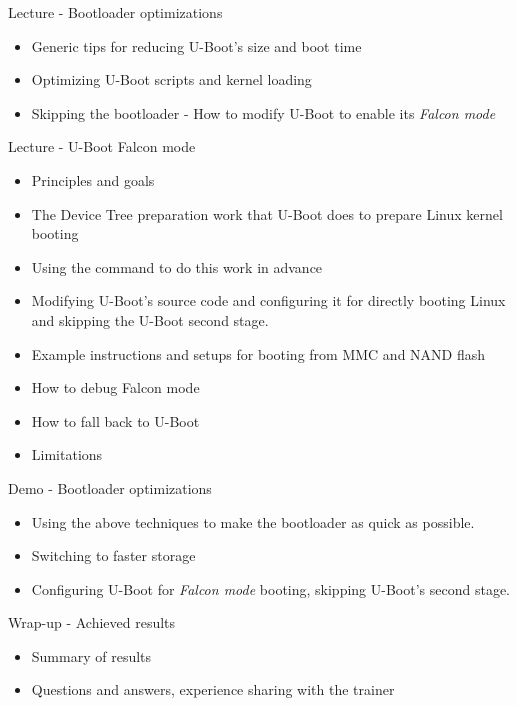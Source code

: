 \documentclass[a4paper,12pt,obeyspaces,spaces,hyphens]{article}
\begin{document}
\feagendatwocolumn
{Lecture - Bootloader optimizations}
{
  \begin{itemize}
  \item Generic tips for reducing U-Boot's size and boot time
  \item Optimizing U-Boot scripts and kernel loading
  \item Skipping the bootloader - How to modify U-Boot to
        enable its {\em Falcon mode}
  \end{itemize}
}
{Lecture - U-Boot Falcon mode}
{
  \begin{itemize}
  \item Principles and goals
  \item The Device Tree preparation work that U-Boot does to prepare Linux kernel booting
  \item Using the  command to do this work in advance
  \item Modifying U-Boot's source code and configuring it for directly
        booting Linux and skipping the U-Boot second stage.
  \item Example instructions and setups for booting from MMC and NAND flash
  \item How to debug Falcon mode
  \item How to fall back to U-Boot
  \item Limitations
  \end{itemize}
}

\feagendaonecolumn
{Demo - Bootloader optimizations}
{
 \begin{itemize}
 \item Using the above techniques to make the bootloader
       as quick as possible.
 \item Switching to faster storage
 \item Configuring U-Boot for {\em Falcon mode} booting,
       skipping U-Boot's second stage.
 \end{itemize}
}

\feagendaonecolumn
{Wrap-up - Achieved results}
{
 \begin{itemize}
 \item Summary of results
 \item Questions and answers, experience sharing with the trainer
 \end{itemize}
}
\end{document}
